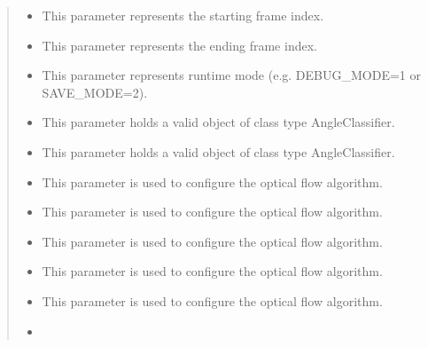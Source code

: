 \documentclass[letterpaper,10pt,english]{sphinxmanual}
\begin{document}
\begin{fulllineitems}
\begin{fulllineitems}
\begin{quote}
\begin{description}
\begin{itemize}
\item {} 
 \textendash{} This parameter represents the starting frame index.

\item {} 
 \textendash{} This parameter represents the ending frame index.

\item {} 
 \textendash{} This parameter represents runtime mode (e.g. DEBUG\_MODE=1 or SAVE\_MODE=2).

\item {} 
 \textendash{} This parameter holds a valid object of class type AngleClassifier.

\item {} 
 \textendash{} This parameter holds a valid object of class type AngleClassifier.

\item {} 
 \textendash{} This parameter is used to configure the optical flow algorithm.

\item {} 
 \textendash{} This parameter is used to configure the optical flow algorithm.

\item {} 
 \textendash{} This parameter is used to configure the optical flow algorithm.

\item {} 
 \textendash{} This parameter is used to configure the optical flow algorithm.

\item {} 
 \textendash{} This parameter is used to configure the optical flow algorithm.

\item {} 
 \textendash{} 

\end{itemize}

\end{description}\end{quote}


\end{fulllineitems}
\end{fulllineitems}
\end{document}

